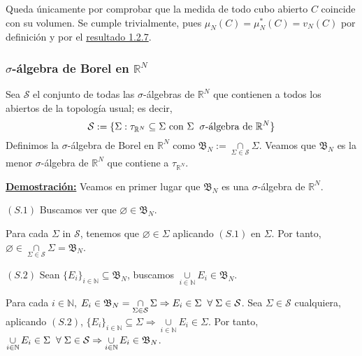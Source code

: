 \documentclass[12pt,a4paper]{article}
\newcommand{\R}{\mathbb{R}}
\newcommand{\N}{\mathbb{N}}
\newcommand{\smallcup}{\mathop{\cup}\limits}
\newcommand{\smallcap}{\mathop{\cap}\limits}
\newcounter{unit}[section]
\newcounter{chapter}[unit]
\renewcommand{\theunit}{\arabic{unit}}
\renewcommand{\thechapter}{\arabic{chapter}}
\renewcommand{\thesubsubsection}{\theunit.\thechapter.\arabic{subsubsection}}
\newcommand{\result}[1]{%
  \subsubsection{#1}%
  \label{result:\thesubsubsection}
}
\newcommand{\dem}{
    \noindent \underline{\textbf{Demostración:}}
}
\begin{document}
\vspace{4mm} %
Queda únicamente por comprobar que la medida de todo cubo abierto $C$ coincide con su volumen. Se cumple trivialmente, pues $\mu_N(C) = \mu^*_N(C) = v_N(C)$ por definición y por el \hyperref[result:1.2.7]{resultado 1.2.7}.

\vspace{6mm}
\result{\texorpdfstring{$\sigma$}{s}-álgebra de Borel en \texorpdfstring{$\R^N$}{R\^N}}
\hspace{3mm} Sea $\mathcal{S}$ el conjunto de todas las $\sigma$-álgebras de $\R^N$ que contienen a todos los abiertos de la topología usual; es decir,
\\[-3ex]
$$ \mathcal{S} := \{\Sigma : \tau_{\R^N} \subseteq \Sigma \text{ con } \Sigma \hspace{2mm} \sigma\text{-álgebra de } \R^N\} $$
Definimos la $\sigma$-álgebra de Borel en $\R^N$ como $\mathfrak{B}_N := \smallcap_{\Sigma \in \mathcal{S}} \Sigma$. Veamos que $\mathfrak{B}_N$ es la menor $\sigma$-álgebra de $\R^N$ que contiene a $\tau_{\R^N}$.

\vspace{4mm} \dem Veamos en primer lugar que $\mathfrak{B}_N$ es una $\sigma$-álgebra de $\R^N$.

\noindent
$(S.1)$ Buscamos ver que $\varnothing \in \mathfrak{B}_N$.
\begin{adjustwidth}{0.07\textwidth}{}
    Para cada $\Sigma$ in $\mathcal{S}$, tenemos que $\varnothing \in \Sigma$ aplicando $(S.1)$ en $\Sigma$.
    \newline Por tanto, $\varnothing \in \smallcap_{\Sigma \in \mathcal{S}} \Sigma = \mathfrak{B}_N$.
\end{adjustwidth}

\newpage
\noindent $(S.2)$ Sean $\{E_i\}_{i \in \N} \subseteq \mathfrak{B}_N$, buscamos $\smallcup_{i\in\N}E_i \in \mathfrak{B}_N$.
\begin{adjustwidth}{0.07\textwidth}{}
    \vspace{1mm} Para cada $i \in \N$, $E_i \in \mathfrak{B}_N = \smallcap_{\Sigma \in \mathcal{S}} \Sigma \Rightarrow E_i \in \Sigma \hspace{2mm} \forall \hspace{1mm} \Sigma \in \mathcal{S}$.
    \vspace{1mm} \newline Sea $\Sigma \in \mathcal{S}$ cualquiera, aplicando $(S.2)$, $\{E_i \}_{i \in \N} \subseteq \Sigma \Rightarrow \smallcup_{i\in\N}E_i \in \Sigma$.
    \vspace{1mm} \newline Por tanto, $\smallcup_{i\in\N} E_i \in \Sigma \hspace{2mm} \forall \hspace{1mm} \Sigma \in \mathcal{S} \Rightarrow \smallcup_{i\in\N} E_i \in \mathfrak{B}_N$.
\end{adjustwidth}
\end{document}
